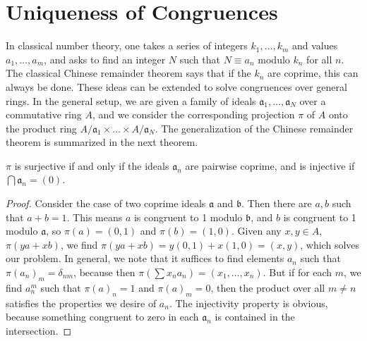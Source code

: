 \section{Uniqueness of Congruences}

In classical number theory, one takes a series of integers $k_1, \dots, k_m$ and values $a_1, \dots, a_m$, and asks to find an integer $N$ such that $N \equiv a_n$ modulo $k_n$ for all $n$. The classical Chinese remainder theorem says that if the $k_n$ are coprime, this can always be done. These ideas can be extended to solve congruences over general rings. In the general setup, we are given a family of ideals $\mathfrak{a}_1, \dots, \mathfrak{a}_N$ over a commutative ring $A$, and we consider the corresponding projection $\pi$ of $A$ onto the product ring $A/\mathfrak{a}_1 \times \dots \times A/\mathfrak{a}_N$. The generalization of the Chinese remainder theorem is summarized in the next theorem.

\begin{theorem}
    $\pi$ is surjective if and only if the ideals $\mathfrak{a}_n$ are pairwise coprime, and is injective if $\bigcap \mathfrak{a}_n = (0)$.
\end{theorem}
\begin{proof}
    Consider the case of two coprime ideals $\mathfrak{a}$ and $\mathfrak{b}$. Then there are $a,b$ such that $a + b = 1$. This means $a$ is congruent to 1 modulo $\mathfrak{b}$, and $b$ is congruent to 1 modulo $\mathfrak{a}$, so $\pi(a) = (0,1)$ and $\pi(b) = (1,0)$. Given any $x,y \in A$, $\pi(ya + xb)$, we find $\pi(ya + xb) = y(0,1) + x(1,0) = (x,y)$, which solves our problem. In general, we note that it suffices to find elements $a_n$ such that $\pi(a_n)_m = \delta_{nm}$, because then $\pi(\sum x_na_n) = (x_1, \dots, x_n)$. But if for each $m$, we find $a_n^m$ such that $\pi(a)_n = 1$ and $\pi(a)_m = 0$, then the product over all $m \neq n$ satisfies the properties we desire of $a_n$. The injectivity property is obvious, because something congruent to zero in each $\mathfrak{a}_n$ is contained in the intersection.
\end{proof}

